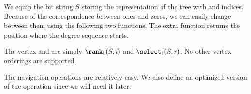 We equip the bit string $S$ storing the representation of the tree with \rank{} and \select{} indices.
Because of the correspondence between ones and zeros, we can easily change between them using the following two functions.
The extra function \toBeginning{} returns the position where the degree sequence starts.

\begin{algorithmic}
	\State {}
\EndFunction
\end{algorithmic}

\begin{algorithmic}
	\State {}
\EndFunction
\end{algorithmic}

\begin{algorithmic}
	\State {}
\EndFunction
\end{algorithmic}

The vertex \inRank{} and \inSelect{} are simply $\rank_1(S, i)$ and $\select_1(S, r)$.
No other vertex orderings are supported.

The navigation operations are relatively easy.
We also define an optimized version of the operation \childLast since we will need it later.

\begin{algorithmic}
	\State {}
\EndFunction
\end{algorithmic}

\begin{algorithmic}
	\State {} 
\EndFunction
\end{algorithmic}

\begin{algorithmic}
	\State {} 
\EndFunction
\end{algorithmic}

\begin{algorithmic}
	\State {} 
\EndFunction
\end{algorithmic}

\begin{algorithmic}
	\State {} 
\EndFunction
\end{algorithmic}

